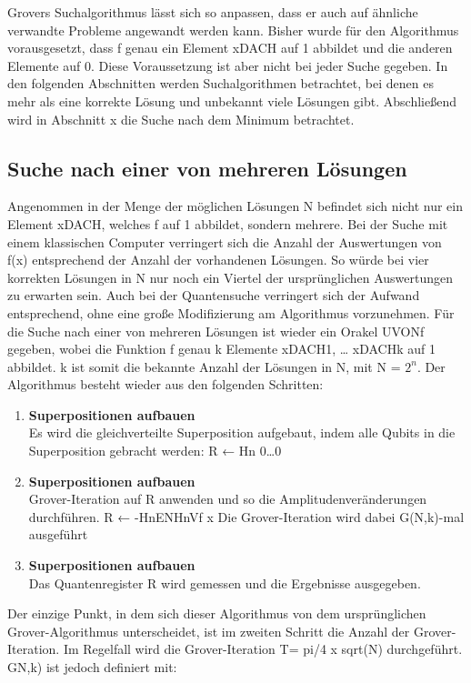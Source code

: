 Grovers Suchalgorithmus lässt sich so anpassen, dass er auch auf ähnliche verwandte Probleme angewandt werden kann. Bisher wurde für den Algorithmus vorausgesetzt, dass f genau ein Element xDACH auf 1 abbildet und die anderen Elemente auf 0. Diese Voraussetzung ist aber nicht bei jeder Suche gegeben. In den folgenden Abschnitten werden Suchalgorithmen betrachtet, bei denen es mehr als eine korrekte Lösung und unbekannt viele Lösungen gibt. Abschließend wird in Abschnitt x die Suche nach dem Minimum betrachtet. 

\subsection{Suche nach einer von mehreren Lösungen}

Angenommen in der Menge der möglichen Lösungen N befindet sich nicht nur ein Element xDACH, welches f auf 1 abbildet, sondern mehrere. Bei der Suche mit einem klassischen Computer verringert sich die Anzahl der Auswertungen von f(x) entsprechend der Anzahl der vorhandenen Lösungen. So würde bei vier korrekten Lösungen in N nur noch ein Viertel der ursprünglichen Auswertungen zu erwarten sein.
Auch bei der Quantensuche verringert sich der Aufwand entsprechend, ohne eine große Modifizierung am Algorithmus vorzunehmen.
Für die Suche nach einer von mehreren Lösungen ist wieder ein Orakel UVONf gegeben, wobei die Funktion f genau k Elemente xDACH1, … xDACHk auf 1 abbildet. k ist somit die bekannte Anzahl der Lösungen in N, mit N = $2^n$. Der Algorithmus besteht wieder aus den folgenden Schritten:

\begin{enumerate}
    \item \textbf{Superpositionen aufbauen}
    \\
    Es wird die gleichverteilte Superposition aufgebaut, indem alle Qubits in die Superposition gebracht werden:
    R ← Hn 0…0  
    \item \textbf{Superpositionen aufbauen}
    \\
    Grover-Iteration auf R anwenden und so die Amplitudenveränderungen durchführen. 
    R ← -HnENHnVf x
    Die Grover-Iteration wird dabei G(N,k)-mal ausgeführt
    \item \textbf{Superpositionen aufbauen}
    \\
    Das Quantenregister R wird gemessen und die Ergebnisse ausgegeben.
\end{enumerate}

Der einzige Punkt, in dem sich dieser Algorithmus von dem ursprünglichen Grover-Algorithmus unterscheidet, ist im zweiten Schritt die Anzahl der Grover-Iteration. Im Regelfall wird die Grover-Iteration T= pi/4 x sqrt(N) durchgeführt. GN,k) ist jedoch definiert mit:

